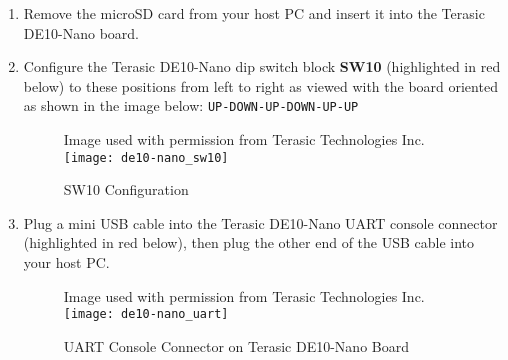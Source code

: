 \begin{flushleft}
\begin{enumerate}[
	label=\textbf{Step \arabic*.},
	leftmargin=*,
	widest={00},
	align=left]
\begin{verbatim}

# create a directory in +\$+DE10_NANO to use as a mount point
+\$+ mkdir sdcard

# mount partition 1 of the microSD card, this is the FAT partition
+\$+ sudo mount +\textcolor{red}{/dev/sdx}+1 sdcard

# copy the required file onto the FAT partition
+\$+ sudo cp +\$+DE10_NANO/blink/output_files/blink.rbf sdcard/

# unmount the FAT partition
+\$+ sudo umount sdcard
+\$+ sudo sync

\end{verbatim}

\item Remove the microSD card from your host PC and insert it into the Terasic DE10-Nano board.

\newpage

\item Configure the Terasic DE10-Nano dip switch block \textbf{SW10} (highlighted in red below) to these positions from left to right as viewed with the board oriented as shown in the image below: \texttt{UP-DOWN-UP-DOWN-UP-UP}

\begin{figure}[H]
\centering
\scriptsize{Image used with permission from Terasic Technologies Inc.}
\newline
\texttt{[image: de10-nano\_sw10]}
\caption{SW10 Configuration}
\label{fig:de10-nano_sw10}
\end{figure}

\item Plug a mini USB cable into the Terasic DE10-Nano UART console connector (highlighted in red below),  then plug the other end of the USB cable into your host PC.

\begin{figure}[H]
\centering
\scriptsize{Image used with permission from Terasic Technologies Inc.}
\newline
\texttt{[image: de10-nano\_uart]}
\caption{UART Console Connector on Terasic DE10-Nano Board}
\label{fig:de10-nano_uart}
\end{figure}


\end{enumerate}
\end{flushleft}
